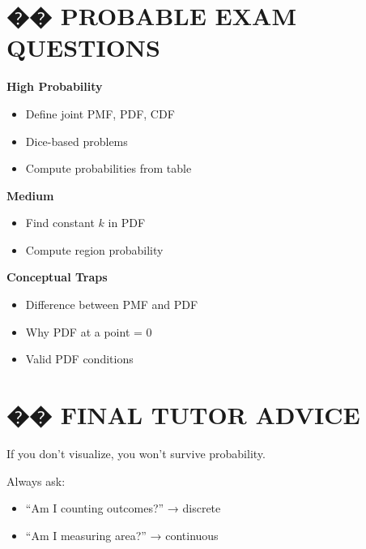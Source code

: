 \documentclass[12pt]{article}
\begin{document}
\section*{�� PROBABLE EXAM QUESTIONS}

\textbf{High Probability}
\begin{itemize}
\item Define joint PMF, PDF, CDF
\item Dice-based problems
\item Compute probabilities from table
\end{itemize}

\textbf{Medium}
\begin{itemize}
\item Find constant $k$ in PDF
\item Compute region probability
\end{itemize}

\textbf{Conceptual Traps}
\begin{itemize}
\item Difference between PMF and PDF
\item Why PDF at a point = 0
\item Valid PDF conditions
\end{itemize}

\section*{�� FINAL TUTOR ADVICE}

If you don’t visualize, you won’t survive probability.

Always ask:
\begin{itemize}
\item “Am I counting outcomes?” → discrete
\item “Am I measuring area?” → continuous
\end{itemize}
\end{document}
